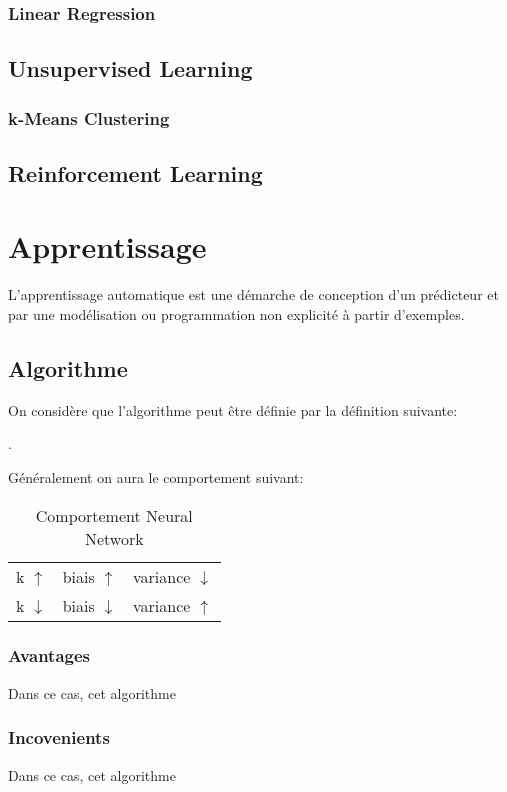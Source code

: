 \documentclass{article}
\begin{document}
\subsubsection{Linear Regression}

\subsection{Unsupervised Learning}
\subsubsection{k-Means Clustering}


\subsection{Reinforcement Learning}


\section{Apprentissage}
L'apprentissage automatique est une démarche de conception d'un prédicteur et par une modélisation ou programmation non explicité à partir d'exemples.

\subsection{Algorithme}
On considère que l'algorithme peut être définie par la définition suivante:
\begin{definition}
    .
\end{definition}

Généralement on aura le comportement suivant:
\begin{table}[H]
    \centering\begin{tabular}{lll}
        k $\uparrow  $ & biais $\uparrow  $ & variance $\downarrow$\\
        k $\downarrow$ & biais $\downarrow$ & variance $\uparrow$\\
    \end{tabular}
    \caption{Comportement Neural Network}
\end{table}

\subsubsection{Avantages}
Dans ce cas, cet algorithme 

\subsubsection{Incovenients}
Dans ce cas, cet algorithme 
\end{document}

